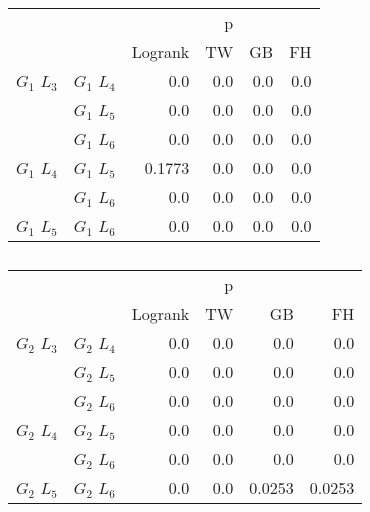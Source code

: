       
      \begin{table}[h!]
        \centering
        \begin{tabular}{llrrrr}
          \toprule
                       &             &         &  p &    &     \\
          \cmidrule{3-6}
                       &             & Logrank & TW & GB & FH  \\
          \midrule
          $G_1$ $L_3$  & $G_1$ $L_4$  &  0.0 &  0.0 &  0.0 &  0.0     \\
                       & $G_1$ $L_5$  & 0.0 & 0.0 & 0.0 & 0.0    \\
                       & $G_1$ $L_6$  & 0.0 & 0.0 & 0.0 & 0.0      \\
          $G_1$ $L_4$  & $G_1$ $L_5$  & 0.1773 & 0.0 & 0.0 & 0.0      \\
                       & $G_1$ $L_6$  & 0.0 & 0.0 & 0.0 & 0.0       \\
          $G_1$ $L_5$   & $G_1$ $L_6$ & 0.0 &  0.0 & 0.0 & 0.0      \\
          \bottomrule
        \end{tabular}
        \label{tab:g1_ingroup_tests_radius}
        \caption{}
      \end{table}


      \begin{table}[h!]
        \centering
        \begin{tabular}{llrrrr}
          \toprule
                       &             &         &  p &    &     \\
          \cmidrule{3-6}
                       &             & Logrank & TW & GB & FH  \\
          \midrule
          $G_2$ $L_3$  & $G_2$ $L_4$  &  0.0 &  0.0 &  0.0 &  0.0     \\
                       & $G_2$ $L_5$  & 0.0 & 0.0 & 0.0 & 0.0    \\
                       & $G_2$ $L_6$  & 0.0 & 0.0 & 0.0 & 0.0      \\
          $G_2$ $L_4$  & $G_2$ $L_5$  & 0.0 & 0.0 & 0.0 & 0.0      \\
                       & $G_2$ $L_6$  & 0.0 & 0.0 & 0.0 & 0.0       \\
          $G_2$ $L_5$   & $G_2$ $L_6$ & 0.0 & 0.0 & 0.0253 & 0.0253      \\
          \bottomrule
        \end{tabular}
        \label{tab:g2_ingroup_tests_radius}
        \caption{}
      \end{table}


